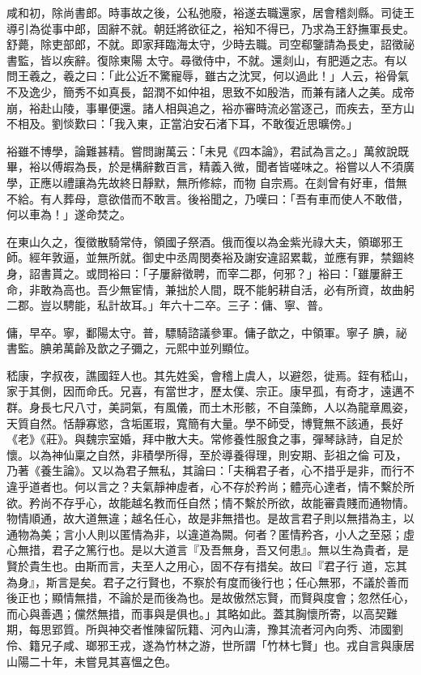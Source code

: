 \begin{pinyinscope}
 咸和初，除尚書郎。時事故之後，公私弛廢，裕遂去職還家，居會稽剡縣。司徒王導引為從事中郎，固辭不就。朝廷將欲征之，裕知不得已，乃求為王舒撫軍長史。舒薨，除吏部郎，不就。即家拜臨海太守，少時去職。司空郗鑒請為長史，詔徵祕書監，皆以疾辭。復除東陽
 太守。尋徵侍中，不就。還剡山，有肥遁之志。有以問王羲之，羲之曰：「此公近不驚寵辱，雖古之沈冥，何以過此！」人云，裕骨氣不及逸少，簡秀不如真長，韶潤不如仲祖，思致不如殷浩，而兼有諸人之美。成帝崩，裕赴山陵，事畢便還。諸人相與追之，裕亦審時流必當逐己，而疾去，至方山不相及。劉惔歎曰：「我入東，正當泊安石渚下耳，不敢復近思曠傍。」



 裕雖不博學，論難甚精。嘗問謝萬云：「未見《四本論》，君試為言之。」萬敘說既畢，裕以傅嘏為長，於是構辭數百言，精義入微，聞者皆嗟味之。裕嘗以人不須廣學，正應以禮讓為先故終日靜默，無所修綜，而物
 自宗焉。在剡曾有好車，借無不給。有人葬母，意欲借而不敢言。後裕聞之，乃嘆曰：「吾有車而使人不敢借，何以車為！」遂命焚之。



 在東山久之，復徵散騎常侍，領國子祭酒。俄而復以為金紫光祿大夫，領瑯邪王師。經年敦逼，並無所就。御史中丞周閔奏裕及謝安違詔累載，並應有罪，禁錮終身，詔書貰之。或問裕曰：「子屢辭徵聘，而宰二郡，何邪？」裕曰：「雖屢辭王命，非敢為高也。吾少無宦情，兼拙於人間，既不能躬耕自活，必有所資，故曲躬二郡。豈以騁能，私計故耳。」年六十二卒。三子：傭、寧、普。



 傭，早卒。寧，鄱陽太守。普，驃騎諮議參軍。傭子歆之，中領軍。寧子
 腆，祕書監。腆弟萬齡及歆之子彌之，元熙中並列顯位。



 嵇康，字叔夜，譙國銍人也。其先姓奚，會稽上虞人，以避怨，徙焉。銍有嵇山，家于其側，因而命氏。兄喜，有當世才，歷太僕、宗正。康早孤，有奇才，遠邁不群。身長七尺八寸，美詞氣，有風儀，而土木形骸，不自藻飾，人以為龍章鳳姿，天質自然。恬靜寡慾，含垢匿瑕，寬簡有大量。學不師受，博覽無不該通，長好《老》《莊》。與魏宗室婚，拜中散大夫。常修養性服食之事，彈琴詠詩，自足於懷。以為神仙稟之自然，非積學所得，至於導養得理，則安期、彭祖之倫
 可及，乃著《養生論》。又以為君子無私，其論曰：「夫稱君子者，心不措乎是非，而行不違乎道者也。何以言之？夫氣靜神虛者，心不存於矜尚；體亮心達者，情不繫於所欲。矜尚不存乎心，故能越名教而任自然；情不繫於所欲，故能審貴賤而通物情。物情順通，故大道無違；越名任心，故是非無措也。是故言君子則以無措為主，以通物為美；言小人則以匿情為非，以違道為闕。何者？匿情矜吝，小人之至惡；虛心無措，君子之篤行也。是以大道言『及吾無身，吾又何患』。無以生為貴者，是賢於貴生也。由斯而言，夫至人之用心，固不存有措矣。故曰『君子行
 道，忘其為身』，斯言是矣。君子之行賢也，不察於有度而後行也；任心無邪，不議於善而後正也；顯情無措，不論於是而後為也。是故傲然忘賢，而賢與度會；忽然任心，而心與善遇；儻然無措，而事與是俱也。」其略如此。蓋其胸懷所寄，以高契難期，每思郢質。所與神交者惟陳留阮籍、河內山濤，豫其流者河內向秀、沛國劉伶、籍兄子咸、瑯邪王戎，遂為竹林之游，世所謂「竹林七賢」也。戎自言與康居山陽二十年，未嘗見其喜慍之色。




\end{pinyinscope}
